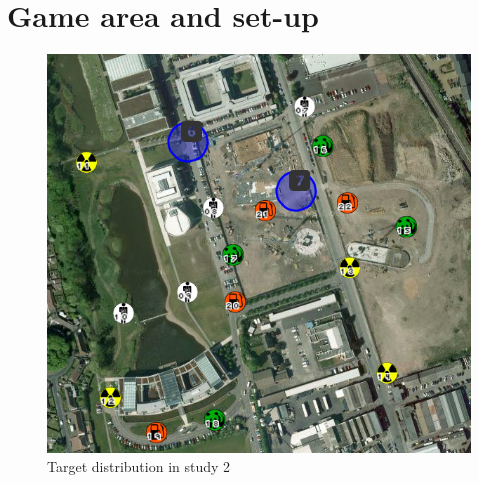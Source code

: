 \section{Game area and set-up}\label{app:area2}
\begin{figure}[H]
  \centering
  \includegraphics[width=1\textwidth]{img/Appendix/targets1}
  \caption{Target distribution in study 2}
\end{figure}

